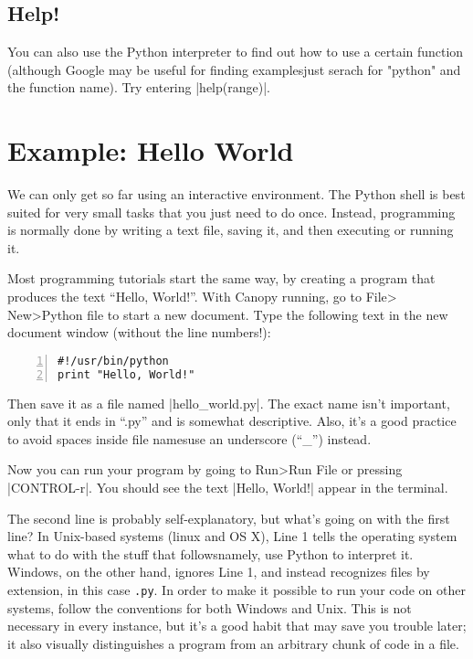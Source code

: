 \documentclass{article}
\begin{document}
\subsection{Help!}
You can also use the Python interpreter to find out how to use a certain function (although Google may be useful for finding examples\textemdash just serach for "python" and the function name).  Try entering |help(range)|.

\section{Example: Hello World}
We can only get so far using an interactive environment.  The Python shell is
best suited for very small tasks that you just need to do once.  Instead,
programming is normally done by writing a text file, saving it, and then
executing or running it.

Most programming tutorials start the same way, by creating a program that
produces the text ``Hello, World!''.  With Canopy running, go to File\textgreater
New\textgreater Python file to start a new document.  Type the following text in the new document
window (without the line numbers!):

\begin{Verbatim}[numbers=left]
#!/usr/bin/python
print "Hello, World!"
\end{Verbatim}

Then save it as a file named |hello_world.py|.  The exact name isn't important,
only that it ends in ``.py'' and is somewhat descriptive.  Also, it's a good practice to
avoid spaces inside file names\textemdash use an underscore (``\_'') instead.

Now you can run your program by going to Run\textgreater Run File or pressing |CONTROL-r|.  You should
see the text |Hello, World!| appear in the terminal.

The second line is probably self-explanatory, but what's going on with the first
line?  In Unix-based systems (linux and OS X), Line 1 tells the operating system
what to do with the stuff that follows\textemdash namely, use Python to
interpret it.  Windows, on the other hand, ignores Line 1, and instead
recognizes files by extension, in this case \texttt{.py}.  In order to make it
possible to run your code on other systems, follow the conventions for both
Windows and Unix.  This is not necessary in every instance, but it's a good
habit that may save you trouble later; it also visually distinguishes a program from an arbitrary chunk of code in a file.
\end{document}
